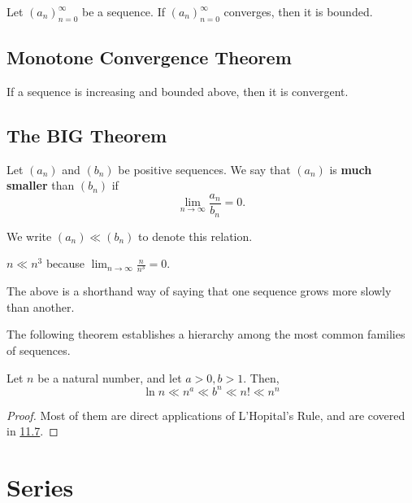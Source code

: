 \documentclass{article}
\begin{document}
    \begin{thm}
        Let \((a_n)_{n=0}^{\infty}\) be a sequence. If \((a_n)_{n=0}^{\infty}\) converges, then it is bounded.
    \end{thm}

    \subsection{Monotone Convergence Theorem}
    \begin{thm}
      If a sequence is increasing and bounded above, then it is convergent.
    \end{thm}
    
    \subsection{The BIG Theorem}
    \begin{defi}
      Let \((a_n)\) and \((b_n)\) be positive sequences. We say that \((a_n)\) is \textbf{much smaller} than \((b_n)\) if
      \[
        \lim_{n \to \infty}\frac{a_n}{b_n} = 0.
      \]
    
      We write \((a_n) \ll (b_n)\) to denote this relation.
    \end{defi} 
    
    \begin{eg}
      \(n \ll n^3\) because \(\lim_{n \to \infty} \frac{n}{n^3} = 0\).
    \end{eg}
    
    The above is a shorthand way of saying that one sequence grows more slowly than another. 
    
    The following theorem establishes a hierarchy among the most common families of sequences.
    
    \begin{thm}
      Let \(n\) be a natural number, and let \(a > 0, b > 1\). Then,
      \[
        \ln{n} \ll n^a \ll b^n \ll n! \ll n^n
      \]
    \end{thm}
    
    \begin{proof}
      Most of them are direct applications of L'Hopital's Rule, and are covered in \href{https://youtu.be/Dd3n2rfqxf4?si=sRu9ItBn7WwUNnSj}{11.7}. 
    \end{proof}

    \section{Series}
\end{document}
